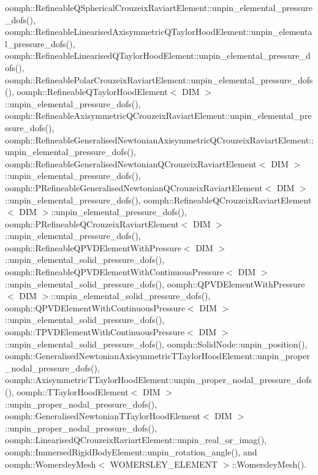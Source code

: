 oomph\+::\+Refineable\+Q\+Spherical\+Crouzeix\+Raviart\+Element\+::unpin\+\_\+elemental\+\_\+pressure\+\_\+dofs(), oomph\+::\+Refineable\+Linearised\+Axisymmetric\+Q\+Taylor\+Hood\+Element\+::unpin\+\_\+elemental\+\_\+pressure\+\_\+dofs(), oomph\+::\+Refineable\+Linearised\+Q\+Taylor\+Hood\+Element\+::unpin\+\_\+elemental\+\_\+pressure\+\_\+dofs(), oomph\+::\+Refineable\+Polar\+Crouzeix\+Raviart\+Element\+::unpin\+\_\+elemental\+\_\+pressure\+\_\+dofs(), oomph\+::\+Refineable\+Q\+Taylor\+Hood\+Element$<$ D\+I\+M $>$\+::unpin\+\_\+elemental\+\_\+pressure\+\_\+dofs(), oomph\+::\+Refineable\+Axisymmetric\+Q\+Crouzeix\+Raviart\+Element\+::unpin\+\_\+elemental\+\_\+pressure\+\_\+dofs(), oomph\+::\+Refineable\+Generalised\+Newtonian\+Axisymmetric\+Q\+Crouzeix\+Raviart\+Element\+::unpin\+\_\+elemental\+\_\+pressure\+\_\+dofs(), oomph\+::\+Refineable\+Generalised\+Newtonian\+Q\+Crouzeix\+Raviart\+Element$<$ D\+I\+M $>$\+::unpin\+\_\+elemental\+\_\+pressure\+\_\+dofs(), oomph\+::\+P\+Refineable\+Generalised\+Newtonian\+Q\+Crouzeix\+Raviart\+Element$<$ D\+I\+M $>$\+::unpin\+\_\+elemental\+\_\+pressure\+\_\+dofs(), oomph\+::\+Refineable\+Q\+Crouzeix\+Raviart\+Element$<$ D\+I\+M $>$\+::unpin\+\_\+elemental\+\_\+pressure\+\_\+dofs(), oomph\+::\+P\+Refineable\+Q\+Crouzeix\+Raviart\+Element$<$ D\+I\+M $>$\+::unpin\+\_\+elemental\+\_\+pressure\+\_\+dofs(), oomph\+::\+Refineable\+Q\+P\+V\+D\+Element\+With\+Pressure$<$ D\+I\+M $>$\+::unpin\+\_\+elemental\+\_\+solid\+\_\+pressure\+\_\+dofs(), oomph\+::\+Refineable\+Q\+P\+V\+D\+Element\+With\+Continuous\+Pressure$<$ D\+I\+M $>$\+::unpin\+\_\+elemental\+\_\+solid\+\_\+pressure\+\_\+dofs(), oomph\+::\+Q\+P\+V\+D\+Element\+With\+Pressure$<$ D\+I\+M $>$\+::unpin\+\_\+elemental\+\_\+solid\+\_\+pressure\+\_\+dofs(), oomph\+::\+Q\+P\+V\+D\+Element\+With\+Continuous\+Pressure$<$ D\+I\+M $>$\+::unpin\+\_\+elemental\+\_\+solid\+\_\+pressure\+\_\+dofs(), oomph\+::\+T\+P\+V\+D\+Element\+With\+Continuous\+Pressure$<$ D\+I\+M $>$\+::unpin\+\_\+elemental\+\_\+solid\+\_\+pressure\+\_\+dofs(), oomph\+::\+Solid\+Node\+::unpin\+\_\+position(), oomph\+::\+Generalised\+Newtonian\+Axisymmetric\+T\+Taylor\+Hood\+Element\+::unpin\+\_\+proper\+\_\+nodal\+\_\+pressure\+\_\+dofs(), oomph\+::\+Axisymmetric\+T\+Taylor\+Hood\+Element\+::unpin\+\_\+proper\+\_\+nodal\+\_\+pressure\+\_\+dofs(), oomph\+::\+T\+Taylor\+Hood\+Element$<$ D\+I\+M $>$\+::unpin\+\_\+proper\+\_\+nodal\+\_\+pressure\+\_\+dofs(), oomph\+::\+Generalised\+Newtonian\+T\+Taylor\+Hood\+Element$<$ D\+I\+M $>$\+::unpin\+\_\+proper\+\_\+nodal\+\_\+pressure\+\_\+dofs(), oomph\+::\+Linearised\+Q\+Crouzeix\+Raviart\+Element\+::unpin\+\_\+real\+\_\+or\+\_\+imag(), oomph\+::\+Immersed\+Rigid\+Body\+Element\+::unpin\+\_\+rotation\+\_\+angle(), and oomph\+::\+Womersley\+Mesh$<$ W\+O\+M\+E\+R\+S\+L\+E\+Y\+\_\+\+E\+L\+E\+M\+E\+N\+T $>$\+::\+Womersley\+Mesh().

